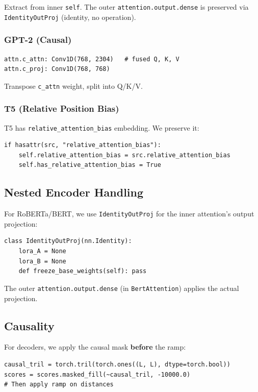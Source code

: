 Extract from inner \texttt{self}. The outer \texttt{attention.output.dense} is preserved 
via \texttt{IdentityOutProj} (identity, no operation).

\subsubsection{GPT-2 (Causal)}

\begin{lstlisting}
attn.c_attn: Conv1D(768, 2304)   # fused Q, K, V
attn.c_proj: Conv1D(768, 768)
\end{lstlisting}

Transpose \texttt{c\_attn} weight, split into Q/K/V.

\subsubsection{T5 (Relative Position Bias)}

T5 has \texttt{relative\_attention\_bias} embedding. We preserve it:

\begin{lstlisting}
if hasattr(src, "relative_attention_bias"):
    self.relative_attention_bias = src.relative_attention_bias
    self.has_relative_attention_bias = True
\end{lstlisting}

\subsection{Nested Encoder Handling}

For RoBERTa/BERT, we use \texttt{IdentityOutProj} for the inner attention's output 
projection:

\begin{lstlisting}
class IdentityOutProj(nn.Identity):
    lora_A = None
    lora_B = None
    def freeze_base_weights(self): pass
\end{lstlisting}

The outer \texttt{attention.output.dense} (in \texttt{BertAttention}) applies the actual 
projection.

\subsection{Causality}

For decoders, we apply the causal mask \textbf{before} the ramp:

\begin{lstlisting}
causal_tril = torch.tril(torch.ones((L, L), dtype=torch.bool))
scores = scores.masked_fill(~causal_tril, -10000.0)
# Then apply ramp on distances
\end{lstlisting}

